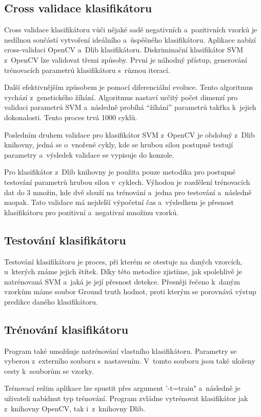 \subsection{Cross validace klasifikátoru}
Cross validace klasifikátoru vůči nějaké sadě negativních a~pozitivních vzorků je nedílnou součástí vytvoření ideálního a~úspěšného klasifikátoru.  Aplikace nabízí cross-validaci OpenCV a~Dlib klasifikátoru. Diskriminační klasifikátor SVM z~OpenCV lze validovat třemi způsoby. První je náhodný přístup, generování trénovacích parametrů klasifikátoru s~různou iterací.

Další efektivnějším způsobem je pomocí diferenciální evoluce. Tento algoritmus vychází z~genetického žíhání. Algoritmus nastaví určitý počet dimenzí pro validaci parametrů SVM a~následně probíhá ``žíhání'' parametrů takřka k~jejich dokonalosti. Tento proces trvá 1000 cyklů.

Posledním druhem validace pro klasifikátor SVM z~OpenCV je obdobný z~Dlib knihovny, jedná se o~vnořené cykly, kde se hrubou silou postupně testují parametry a~výsledek validace se vypisuje do konzole. 

Pro klasifikátor z~Dlib knihovny je použita pouze metodika pro postupné testování parametrů hrubou silou v~cyklech. Výhodou je rozdělení trénovacích dat do 3 množin, kde dvě slouží na trénování a~jedna pro testování a~následně naopak. Tato validace má nejdelší výpočetní čas a~výsledkem je přesnost klasifikátoru pro pozitivní a~negativní množinu vzorků.

\subsection{Testování klasifikátoru}
Testování klasifikátoru je proces, při kterém se otestuje na daných vzorcích, u~kterých známe jejich štítek. Díky této metodice zjistíme, jak spolehlivě je natrénovaná SVM a~jaká je její přesnost detekce. Přesněji řečeno k~daným vzorkům máme soubor Ground truth hodnot, proti kterým se porovnává výstup predikce daného klasifikátoru. 

\subsection{Trénování klasifikátoru}
Program také umožňuje natrénování vlastního klasifikátoru. Parametry se vyberou z~externího souboru s~nastavením. V~tomto souboru jsou také uloženy cesty k~souborům se vzorky. 

Trénovací režim aplikace lze spustit přes argument '-t=train" a~následně je uživateli nabídnut typ trénování. Program zvládne vytrénovat klasifikátor jak z~knihovny OpenCV, tak i~z~knihovny Dlib. 

